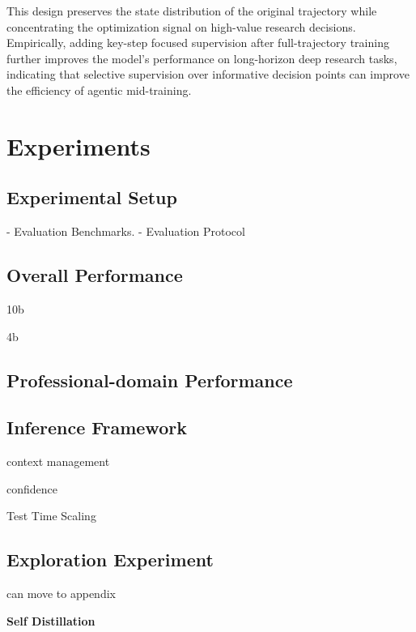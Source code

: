 \documentclass[]{selfevolagent}
\theoremstyle{plain}
\theoremstyle{definition}
\theoremstyle{remark}
\begin{document}
This design preserves the state distribution of the original trajectory while concentrating the optimization signal on high-value research decisions. Empirically, adding key-step focused supervision after full-trajectory training further improves the model's performance on long-horizon deep research tasks, indicating that selective supervision over informative decision points can improve the efficiency of agentic mid-training.




\section{Experiments}

\subsection{Experimental Setup}

- Evaluation Benchmarks.
- Evaluation Protocol


\subsection{Overall Performance}

10b

4b

\subsection{Professional-domain Performance}


\subsection{Inference Framework}

context management

confidence

Test Time Scaling


\subsection{Exploration Experiment}

can move to appendix

\noindent \textbf{Self Distillation}


\end{document}
